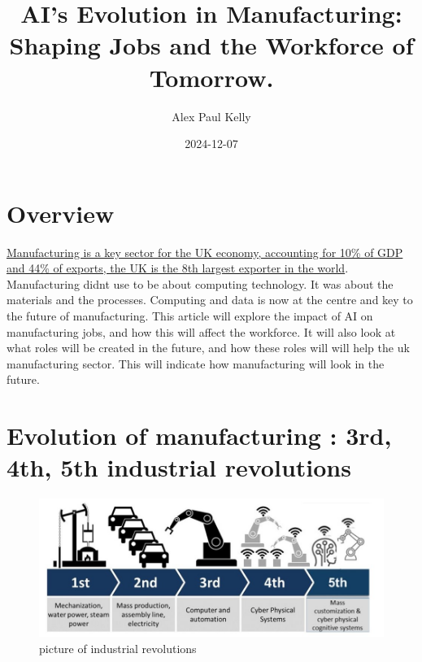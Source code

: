 \documentclass[
  letterpaper,
  DIV=11,
  numbers=noendperiod]{scrartcl}
\title{AI's Evolution in Manufacturing: Shaping Jobs and the Workforce
of Tomorrow.}
\author{Alex Paul Kelly}
\date{2024-12-07}
\renewcommand*\contentsname{Table of contents}
\newcommand\contentsname{Table of contents}
\begin{document}
\maketitle
\ifdefined\Shaded\renewenvironment{Shaded}{\begin{tcolorbox}[breakable, boxrule=0pt, sharp corners, interior hidden, frame hidden, borderline west={3pt}{0pt}{shadecolor}, enhanced]}{\end{tcolorbox}}\fi

\renewcommand*\contentsname{Table of contents}
{
\hypersetup{linkcolor=}
\setcounter{tocdepth}{4}
\tableofcontents
}
\hypertarget{overview}{%
\section{Overview}\label{overview}}

\href{https://www.makeuk.org/insights/publications/uk-manufacturing-the-facts-2023\#/}{Manufacturing
is a key sector for the UK economy, accounting for 10\% of GDP and 44\%
of exports, the UK is the 8th largest exporter in the world}.
Manufacturing didnt use to be about computing technology. It was about
the materials and the processes. Computing and data is now at the centre
and key to the future of manufacturing. This article will explore the
impact of AI on manufacturing jobs, and how this will affect the
workforce. It will also look at what roles will be created in the
future, and how these roles will will help the uk manufacturing sector.
This will indicate how manufacturing will look in the future.

\hypertarget{evolution-of-manufacturing-3rd-4th-5th-industrial-revolutions}{%
\section{Evolution of manufacturing : 3rd, 4th, 5th industrial
revolutions}\label{evolution-of-manufacturing-3rd-4th-5th-industrial-revolutions}}

\begin{figure}

{\centering \includegraphics{./Industry5.jpg}

}

\caption{picture of industrial revolutions}

\end{figure}
\end{document}
